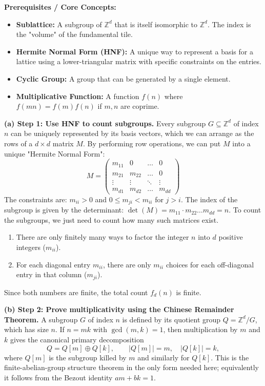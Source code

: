 \begin{solution}
\textbf{Prerequisites / Core Concepts:}
\begin{itemize}
    \item \textbf{Sublattice:} A subgroup of $\mathbb{Z}^d$ that is itself isomorphic to $\mathbb{Z}^d$. The index is the "volume" of the fundamental tile.
    \item \textbf{Hermite Normal Form (HNF):} A unique way to represent a basis for a lattice using a lower-triangular matrix with specific constraints on the entries.
    \item \textbf{Cyclic Group:} A group that can be generated by a single element.
    \item \textbf{Multiplicative Function:} A function $f(n)$ where $f(mn) = f(m)f(n)$ if $m, n$ are coprime.
\end{itemize}

\textbf{(a) Step 1: Use HNF to count subgroups.}
Every subgroup $G \subseteq \mathbb{Z}^d$ of index $n$ can be uniquely represented by its basis vectors, which we can arrange as the rows of a $d \times d$ matrix $M$.
By performing row operations, we can put $M$ into a unique "Hermite Normal Form":
\[ M = \begin{pmatrix} m_{11} & 0 & \dots & 0 \\ m_{21} & m_{22} & \dots & 0 \\ \vdots & \vdots & \ddots & \vdots \\ m_{d1} & m_{d2} & \dots & m_{dd} \end{pmatrix} \]
The constraints are: $m_{ii} > 0$ and $0 \leq m_{ji} < m_{ii}$ for $j > i$.
The index of the subgroup is given by the determinant: $\det(M) = m_{11} \cdot m_{22} \dots m_{dd} = n$.
To count the subgroups, we just need to count how many such matrices exist.
\begin{enumerate}
    \item There are only finitely many ways to factor the integer $n$ into $d$ positive integers ($m_{ii}$).
    \item For each diagonal entry $m_{ii}$, there are only $m_{ii}$ choices for each off-diagonal entry in that column ($m_{ji}$).
\end{enumerate}
Since both numbers are finite, the total count $f_d(n)$ is finite.

\textbf{(b) Step 2: Prove multiplicativity using the Chinese Remainder Theorem.}
A subgroup $G$ of index $n$ is defined by its quotient group $Q = \mathbb{Z}^d / G$, which has size $n$.
If $n = mk$ with $\gcd(m, k) = 1$, then multiplication by $m$ and $k$ gives the canonical primary decomposition
\[
Q=Q[m]\oplus Q[k],
\qquad |Q[m]|=m,\quad |Q[k]|=k,
\]
where $Q[m]$ is the subgroup killed by $m$ and similarly for $Q[k]$. This is the finite-abelian-group structure theorem in the only form needed here; equivalently it follows from the Bezout identity $am+bk=1$.


\end{solution}
